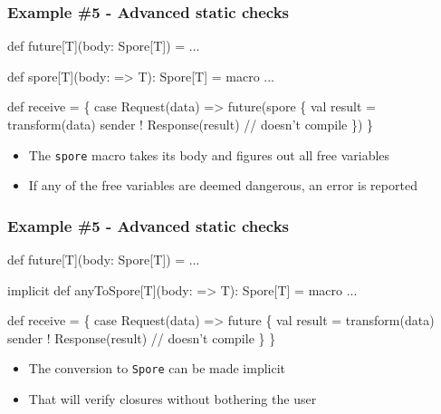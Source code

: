 \documentclass[svgnames,hyperref={bookmarks=false}]{beamer}
\begin{document}
\begin{frame}[fragile, t]
\frametitle{Example \#5 - Advanced static checks}

\begin{semiverbatim}
def future[T](body: \alert{Spore[T]}) = ...

\alert{def spore[T](body: => T): Spore[T] = macro ...}

def receive = \{
  case Request(data) =>
    future(\alert{spore \{}
      val result = transform(data)
      sender ! Response(result) \alert{// doesn't compile}
    \alert{\}})
\}

\end{semiverbatim}

\begin{itemize}
\item The \texttt{spore} macro takes its body and figures out all free variables
\item If any of the free variables are deemed dangerous, an error is reported
\end{itemize}
\end{frame}

\begin{frame}[fragile, t]
\frametitle{Example \#5 - Advanced static checks}

\begin{semiverbatim}
def future[T](body: Spore[T]) = ...

\alert{implicit def anyToSpore[T](body: => T): Spore[T] = macro ...}

def receive = \{
  case Request(data) =>
    future \alert{\{}
      val result = transform(data)
      sender ! Response(result) \alert{// doesn't compile}
    \alert{\}}
\}

\end{semiverbatim}

\begin{itemize}
\item The conversion to \texttt{Spore} can be made implicit
\item That will verify closures without bothering the user
\end{itemize}
\end{frame}

\begin{frame}[fragile]
\frametitle{}

\vskip40pt
\begin{center}
\end{center}
\end{frame}
\end{document}
